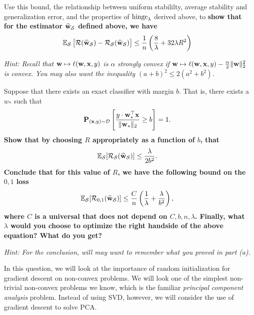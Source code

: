 \documentclass[preview]{standalone}
\begin{document}
\begin{Parts}
Use this bound,  the relationship between uniform stabililty, average stability and generalization error, and the properties of $\mathrm{hinge}_{\lambda}$ derived above, to \textbf{show that for the estimator $\widehat{\boldsymbol{\mathbf{w}}}_{\mathcal{S}}$ defined above, we have }
\begin{align*}
\mathbb{E}_{\mathcal{S}}\left[\mathcal{R}(\widehat{\boldsymbol{\mathbf{w}}}_{\mathcal{S}}) - \mathcal{R}_{\mathcal{S}}(\widehat{\boldsymbol{\mathbf{w}}}_{\mathcal{S}})\right] \le \frac{1}{n}\left(\frac{8 }{\lambda} + 32 \lambda R^2\right)
\end{align*}

\emph{Hint: Recall that $\boldsymbol{\mathbf{w}} \mapsto \ell(\boldsymbol{\mathbf{w}},\boldsymbol{\mathbf{x}},y)$ is $\alpha$ strongly convex if $\boldsymbol{\mathbf{w}} \mapsto \ell(\boldsymbol{\mathbf{w}},\boldsymbol{\mathbf{x}},y) - \frac{\alpha}{2}\|\boldsymbol{\mathbf{w}}\|_2^2$ is convex. You may also want the inequality $(a+b)^2 \le 2(a^2 + b^2)$.}


\Part
Suppose that there exists an exact classifier with margin $b$. That is, there exists a $w_*$ such that
\begin{align*}
\mathbf{P}_{(\boldsymbol{\mathbf{x}},y) \sim \mathcal{D}}\left[ \frac{y \cdot \boldsymbol{\mathbf{w}}_*^\top \boldsymbol{\mathbf{x}}  }{\|\boldsymbol{\mathbf{w}}_*\|_2} \ge b\right] = 1.
\end{align*}
\textbf{Show that by choosing $R$ appropriately as a function of $b$, that
\begin{align*}
\mathbb{E}_{\mathcal{S}}[\mathcal{R}_{\mathcal{S}}(\widehat{\boldsymbol{\mathbf{w}}}_{\mathcal{S}})] \le \frac{\lambda }{2b^2}.
\end{align*}
Conclude that for this value of $R$, we have the following bound on the $0,1$ loss
\begin{align*}
\mathbb{E}_{\mathcal{S}}[\mathcal{R}_{0,1}(\widehat{\boldsymbol{\mathbf{w}}}_{\mathcal{S}})] \le \frac{C}{n}\left( \frac{1}{\lambda} + \frac{\lambda}{b^2}\right),
\end{align*}
where $C$ is a universal that does not depend on $C,b,n,\lambda$. Finally, what $\lambda$ would you choose to optimize the right handside of the above equation? What do you get?}

\emph{Hint: For the conclusion, will may want to remember what you proved in part (a).}







\end{Parts}
\iffalse
\fi


In this question, we will look at the importance of random initialization for
gradient descent on non-convex problems.
We will look one of the simplest non-trivial non-convex problems we know, which is
the familiar \emph{principal component analysis} problem.
Instead of using SVD, however, we will consider the use of gradient descent to solve PCA.
\end{document}
